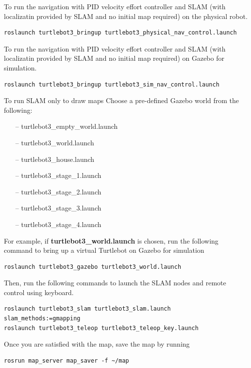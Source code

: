 \documentclass[12]{article}
\begin{document}
To run the navigation with PID velocity effort controller and SLAM (with localizatin provided by SLAM and no initial map required) on the physical robot. 
\begin{lstlisting}[style=bash]
roslaunch turtlebot3_bringup turtlebot3_physical_nav_control.launch 
\end{lstlisting}

To run the navigation with PID velocity effort controller and SLAM (with localizatin provided by SLAM and no initial map required) on Gazebo for simulation.  
\begin{lstlisting}[style=bash]
roslaunch turtlebot3_bringup turtlebot3_sim_nav_control.launch 
\end{lstlisting}

To run SLAM only to draw maps
Choose a pre-defined Gazebo world from the following:

\begin{itemize}
    \item[--] turtlebot3\_empty\_world.launch
    \item[--] turtlebot3\_world.launch
    \item[--] turtlebot3\_house.launch
    \item[--] turtlebot3\_stage\_1.launch
    \item[--] turtlebot3\_stage\_2.launch
    \item[--] turtlebot3\_stage\_3.launch 
    \item[--] turtlebot3\_stage\_4.launch
\end {itemize}
For example, if \textbf{turtlebot3\_world.launch} is chosen, run the following command to bring up a virtual Turtlebot on Gazebo for simulation
\begin{lstlisting}[style=bash]
roslaunch turtlebot3_gazebo turtlebot3_world.launch
\end{lstlisting}
\newpage
Then, run the following commands to launch the SLAM nodes and remote control using keyboard. 
\begin{lstlisting}[style=bash]
roslaunch turtlebot3_slam turtlebot3_slam.launch slam_methods:=gmapping
roslaunch turtlebot3_teleop turtlebot3_teleop_key.launch
\end{lstlisting}
Once you are satisfied with the map, save the map by running
\begin{lstlisting}[style=bash]
rosrun map_server map_saver -f ~/map
\end{lstlisting}
\newpage
\end{document}
